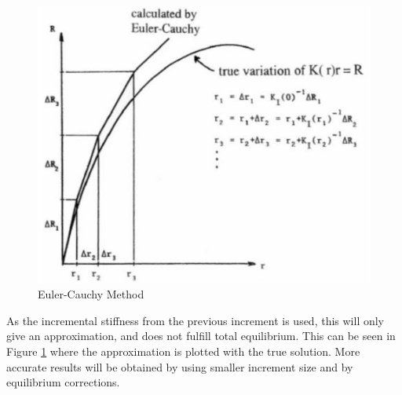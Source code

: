 \begin{figure}[H]
\centering
\includegraphics[scale=1]{figures/euler}
\caption[$\; \:$Euler-Cauchy Method]{Euler-Cauchy Method  \cite{moan2003} }
 \label{fig:euler}
\end{figure}
\noindent As the incremental stiffness from the previous increment is used, this will only give an approximation, and does not fulfill total equilibrium. This can be seen in Figure \ref{fig:euler} where the approximation is plotted with the true solution. More accurate results will be obtained by using smaller increment size and by equilibrium corrections. 

